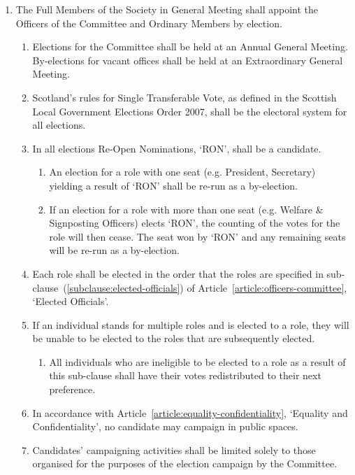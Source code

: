 \documentclass[12pt]{constitution}
\begin{document}
\begin{enumerate}
    \item The Full Members of the Society in General Meeting shall appoint the Officers of the Committee and Ordinary Members by election.
    \begin{enumerate}
        \item Elections for the Committee shall be held at an Annual General Meeting. By-elections for vacant offices shall be held at an Extraordinary General Meeting.
        \item Scotland's rules for Single Transferable Vote, as defined in the Scottish Local Government Elections Order 2007, shall be the electoral system for all elections.
        \item In all elections Re-Open Nominations, `RON', shall be a candidate.
        \begin{enumerate}
            \item An election for a role with one seat (e.g. President, Secretary) yielding a result of `RON' shall be re-run as a by-election.
            \item If an election for a role with more than one seat (e.g. Welfare \& Signposting Officers) elects `RON', the counting of the votes for the role will then cease. The seat won by `RON' and any remaining seats will be re-run as a by-election.
        \end{enumerate}
        \item Each role shall be elected in the order that the roles are specified in sub-clause~(\ref{subclause:elected-officials}) of Article~\ref{article:officers-committee}, `Elected Officials'.
        \item If an individual stands for multiple roles and is elected to a role, they will be unable to be elected to the roles that are subsequently elected.
        \begin{enumerate}
            \item All individuals who are ineligible to be elected to a role as a result of this sub-clause shall have their votes redistributed to their next preference.
        \end{enumerate}
        \item In accordance with Article~\ref{article:equality-confidentiality}, `Equality and Confidentiality', no candidate may campaign in public spaces.
        \item Candidates' campaigning activities shall be limited solely to those organised for the purposes of the election campaign by the Committee.

\end{enumerate}
\end{enumerate}
\end{document}
